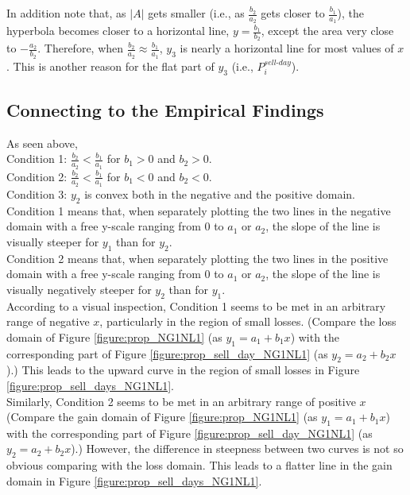 \documentclass[11pt, a4paper]{article}
\begin{document}
In addition note that, as $|A|$ gets smaller (i.e., as $\frac{b_2}{a_2}$ gets closer to $\frac{b_1}{a_1}$), the hyperbola becomes closer to a horizontal line, $y=\frac{b_1}{b_2}$, except the area very close to $-\frac{a_2}{b_2}$. Therefore, when $\frac{b_2}{a_2} \approx \frac{b_1}{a_1}$, $y_3$ is nearly a horizontal line for most values of $x$. This is another reason for the flat part of $y_3$ (i.e., $P^{sell\mbox{-}day}_{i}$). 


\subsection{Connecting to the Empirical Findings}
\label{section:emp_cond}
\noindent
As seen above,\\
Condition 1: $\frac{b_2}{a_2} < \frac{b_1}{a_1}$ for $b_1>0$ and $b_2>0$.\\
Condition 2: $\frac{b_2}{a_2} < \frac{b_1}{a_1}$ for $b_1<0$ and $b_2<0$.\\
Condition 3: $y_2$ is convex both in the negative and the positive domain.\\

\noindent
Condition 1 means that, when separately plotting the two lines in the negative domain with a free y-scale ranging from 0 to $a_1$ or $a_2$, the slope of the line is visually steeper for $y_1$ than for $y_2$.\\
Condition 2 means that, when separately plotting the two lines in the positive domain with a free y-scale ranging from 0 to $a_1$ or $a_2$, the slope of the line is visually negatively steeper for $y_2$ than for $y_1$.\\

\noindent
According to a visual inspection, Condition 1 seems to be met in an arbitrary range of negative $x$, particularly in the region of small losses. (Compare the loss domain of Figure \ref{figure:prop_NG1NL1} (as $y_1=a_1+b_1x$) with the corresponding part of Figure \ref{figure:prop_sell_day_NG1NL1} (as $y_2=a_2+b_2x$).) This leads to the upward curve in the region of small losses in Figure \ref{figure:prop_sell_days_NG1NL1}.\\

\noindent
Similarly, Condition 2 seems to be met in an arbitrary range of positive $x$ (Compare the gain domain of Figure \ref{figure:prop_NG1NL1} (as $y_1=a_1+b_1x$) with the corresponding part of Figure \ref{figure:prop_sell_day_NG1NL1} (as $y_2=a_2+b_2x$).) However, the difference in steepness between two curves is not so obvious comparing with the loss domain. This leads to a flatter line in the gain domain in Figure \ref{figure:prop_sell_days_NG1NL1}.\\
\end{document}
